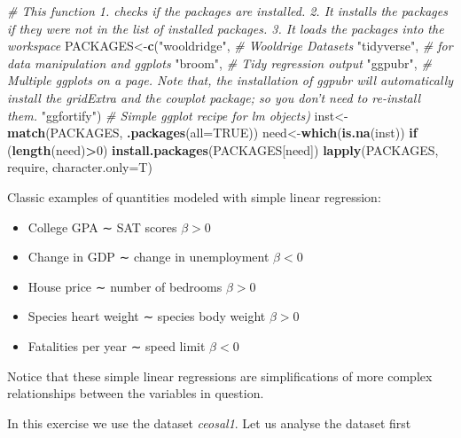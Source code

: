 \documentclass[]{book}
\newenvironment{Shaded}{\begin{snugshade}}{\end{snugshade}}
\newcommand{\CommentTok}[1]{\textcolor[rgb]{0.56,0.35,0.01}{\textit{#1}}}
\newcommand{\ControlFlowTok}[1]{\textcolor[rgb]{0.13,0.29,0.53}{\textbf{#1}}}
\newcommand{\DataTypeTok}[1]{\textcolor[rgb]{0.13,0.29,0.53}{#1}}
\newcommand{\DecValTok}[1]{\textcolor[rgb]{0.00,0.00,0.81}{#1}}
\newcommand{\KeywordTok}[1]{\textcolor[rgb]{0.13,0.29,0.53}{\textbf{#1}}}
\newcommand{\NormalTok}[1]{#1}
\newcommand{\OperatorTok}[1]{\textcolor[rgb]{0.81,0.36,0.00}{\textbf{#1}}}
\newcommand{\OtherTok}[1]{\textcolor[rgb]{0.56,0.35,0.01}{#1}}
\newcommand{\StringTok}[1]{\textcolor[rgb]{0.31,0.60,0.02}{#1}}
\providecommand{\tightlist}{%
  \setlength{\itemsep}{0pt}\setlength{\parskip}{0pt}}
\begin{document}
\begin{Shaded}
\begin{Highlighting}[]
\CommentTok{# This function 1. checks if the packages are installed. 2. It installs the packages if they were not in the list of installed packages. 3. It loads the packages into the workspace}
\NormalTok{PACKAGES<-}\KeywordTok{c}\NormalTok{(}\StringTok{"wooldridge"}\NormalTok{,  }\CommentTok{# Wooldrige Datasets}
            \StringTok{"tidyverse"}\NormalTok{,  }\CommentTok{# for data manipulation and ggplots}
            \StringTok{"broom"}\NormalTok{,  }\CommentTok{# Tidy regression output}
            \StringTok{"ggpubr"}\NormalTok{,  }\CommentTok{# Multiple ggplots on a page. Note that, the installation of ggpubr will automatically install the gridExtra and the cowplot package; so you don’t need to re-install them. }
            \StringTok{"ggfortify"}\NormalTok{) }\CommentTok{# Simple ggplot recipe for lm objects)}
\NormalTok{inst<-}\KeywordTok{match}\NormalTok{(PACKAGES, }\KeywordTok{.packages}\NormalTok{(}\DataTypeTok{all=}\OtherTok{TRUE}\NormalTok{))}
\NormalTok{need<-}\KeywordTok{which}\NormalTok{(}\KeywordTok{is.na}\NormalTok{(inst))}
\ControlFlowTok{if}\NormalTok{ (}\KeywordTok{length}\NormalTok{(need)}\OperatorTok{>}\DecValTok{0}\NormalTok{) }\KeywordTok{install.packages}\NormalTok{(PACKAGES[need])}
\KeywordTok{lapply}\NormalTok{(PACKAGES, require, }\DataTypeTok{character.only=}\NormalTok{T)}
\end{Highlighting}
\end{Shaded}

Classic examples of quantities modeled with simple linear regression:

\begin{itemize}
\tightlist
\item
  College GPA ∼ SAT scores \(\beta > 0\)
\item
  Change in GDP ∼ change in unemployment \(\beta < 0\)
\item
  House price ∼ number of bedrooms \(\beta > 0\)
\item
  Species heart weight ∼ species body weight \(\beta > 0\)
\item
  Fatalities per year ∼ speed limit \(\beta < 0\)
\end{itemize}

Notice that these simple linear regressions are simplifications of more
complex relationships between the variables in question.

In this exercise we use the dataset \emph{ceosal1}. Let us analyse the
dataset first
\end{document}
